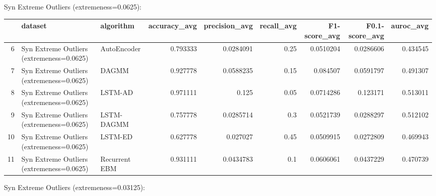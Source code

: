 Syn Extreme Outliers (extremeness=0.0625):

\begin{tabular}{rllrrrrrr}
\hline
    & dataset                                   & algorithm     &   accuracy\_avg &   precision\_avg &   recall\_avg &   F1-score\_avg &   F0.1-score\_avg &   auroc\_avg \\
\hline
  6 & Syn Extreme Outliers (extremeness=0.0625) & AutoEncoder   &       0.793333 &       0.0284091 &         0.25 &      0.0510204 &        0.0286606 &    0.434545 \\
  7 & Syn Extreme Outliers (extremeness=0.0625) & DAGMM         &       0.927778 &       0.0588235 &         0.15 &      0.084507  &        0.0591797 &    0.491307 \\
  8 & Syn Extreme Outliers (extremeness=0.0625) & LSTM-AD       &       0.971111 &       0.125     &         0.05 &      0.0714286 &        0.123171  &    0.513011 \\
  9 & Syn Extreme Outliers (extremeness=0.0625) & LSTM-DAGMM    &       0.757778 &       0.0285714 &         0.3  &      0.0521739 &        0.0288297 &    0.512102 \\
 10 & Syn Extreme Outliers (extremeness=0.0625) & LSTM-ED       &       0.627778 &       0.027027  &         0.45 &      0.0509915 &        0.0272809 &    0.469943 \\
 11 & Syn Extreme Outliers (extremeness=0.0625) & Recurrent EBM &       0.931111 &       0.0434783 &         0.1  &      0.0606061 &        0.0437229 &    0.470739 \\
\hline
\end{tabular}

Syn Extreme Outliers (extremeness=0.03125):

